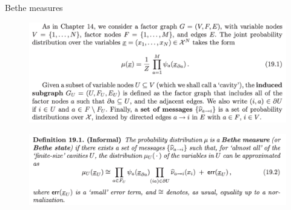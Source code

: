 \documentclass[UTF8]{beamer}
\begin{document}
\begin{frame}{Bethe measures}
  \begin{minipage}[c]{0.9\linewidth}
    \begin{figure}
      \centering
      \includegraphics[width=0.9\linewidth]{./fig/Eq_191.png}
    \end{figure}
  \end{minipage}
  \vfill
  \begin{minipage}[c]{0.9\linewidth}
    \begin{figure}
      \centering
      \includegraphics[width=0.9\linewidth]{./fig/Eq_192.png}
    \end{figure}
  \end{minipage}
\end{frame}
\end{document}
